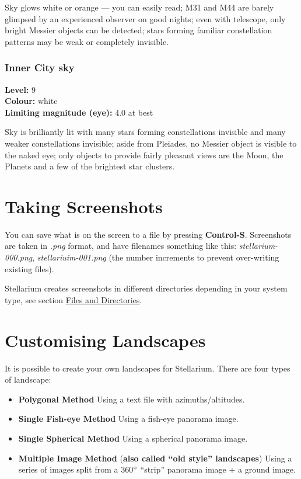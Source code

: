 Sky glows white or orange --- you can easily read; M31 and M44 are barely glimpsed by an experienced observer on good nights; even with telescope, only bright Messier objects can be detected; stars forming familiar constellation patterns may be weak or completely invisible.

\subsubsection{Inner City sky}
\textbf{Level:} 9 \\
\textbf{Colour:} white \\
\textbf{Limiting magnitude (eye):} 4.0 at best

Sky is brilliantly lit with many stars forming constellations invisible and many weaker
constellations invisible; aside from Pleiades, no Messier object is visible to the naked eye; only objects to provide fairly pleasant views are the Moon, the Planets and a few of the brightest star clusters.

\section{Taking Screenshots}\label{taking-screenshots}

You can save what is on the screen to a file by pressing
\textbf{Control-S}. Screenshots are taken in \emph{.png} format, and
have filenames something like this: \emph{stellarium-000.png},
\emph{stellariuim-001.png} (the number increments to prevent
over-writing existing files).

Stellarium creates screenshots in different directories depending in
your system type, see section
\href{Advanced_Use\#Files_and_Directories}{Files and Directories}.

\section{Customising Landscapes}\label{customising-landscapes}

It is possible to create your own landscapes for Stellarium. There are
four types of landscape:

\begin{itemize}
\item
  \textbf{Polygonal Method} Using a text file with azimuths/altitudes.
\item
  \textbf{Single Fish-eye Method} Using a fish-eye panorama image.
\item
  \textbf{Single Spherical Method} Using a spherical panorama image.
\item
  \textbf{Multiple Image Method} (\textbf{also called ``old style''
  landscapes}) Using a series of images split from a 360$\degree$ ``strip''
  panorama image + a ground image.
\end{itemize}

